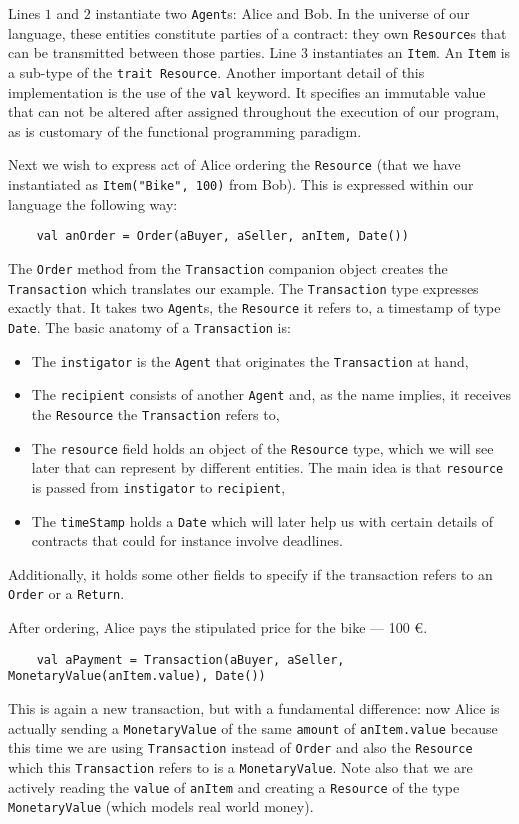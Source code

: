\documentclass{ituthesis}
\begin{document}
Lines $1$ and $2$ instantiate two \texttt{Agent}s: Alice and Bob. In the universe of our language, these entities constitute parties of a contract: they own \texttt{Resource}s that can be transmitted between those parties.\newline
Line $3$ instantiates an \texttt{Item}. An \texttt{Item} is a sub-type of the \texttt{trait Resource}.\newline
Another important detail of this implementation is the use of the \texttt{val} keyword. It specifies an immutable value that can not be altered after assigned throughout the execution of our program, as is customary of the functional programming paradigm.

Next we wish to express act of Alice ordering the \texttt{Resource} (that we have instantiated as \texttt{Item("Bike", 100)} from Bob). This is expressed within our language the following way:
\begin{lstlisting}
    val anOrder	= Order(aBuyer, aSeller, anItem, Date())
\end{lstlisting}
The \texttt{Order} method from the \texttt{Transaction} companion object creates the \texttt{Transaction} which translates our example. The \texttt{Transaction} type expresses exactly that. It takes two \texttt{Agent}s, the \texttt{Resource} it refers to, a timestamp of type \texttt{Date}. The basic anatomy of a \texttt{Transaction} is:
\begin{itemize}
    \item The \texttt{instigator} is the \texttt{Agent} that originates the \texttt{Transaction} at hand,
    \item The \texttt{recipient} consists of another \texttt{Agent} and, as the name implies, it receives the \texttt{Resource} the \texttt{Transaction} refers to,
    \item The \texttt{resource} field holds an object of the \texttt{Resource} type, which we will see later that can represent by different entities. The main idea is that \texttt{resource} is passed from \texttt{instigator} to \texttt{recipient},
    \item The \texttt{timeStamp} holds a \texttt{Date} which will later help us with certain details of contracts that could for instance involve deadlines.
\end{itemize}
Additionally, it holds some other fields to specify if the transaction refers to an \texttt{Order} or a \texttt{Return}.

After ordering, Alice pays the stipulated price for the bike --- 100 €.
\begin{lstlisting}
	val aPayment = Transaction(aBuyer, aSeller, MonetaryValue(anItem.value), Date())
\end{lstlisting}
This is again a new transaction, but with a fundamental difference: now Alice is actually sending a \texttt{MonetaryValue} of the same \texttt{amount} of \texttt{anItem.value} because this time we are using \texttt{Transaction} instead of \texttt{Order} and also the \texttt{Resource} which this \texttt{Transaction} refers to is a \texttt{MonetaryValue}. Note also that we are actively reading the \texttt{value} of \texttt{anItem} and creating a \texttt{Resource} of the type \texttt{MonetaryValue} (which models real world money).
\end{document}
